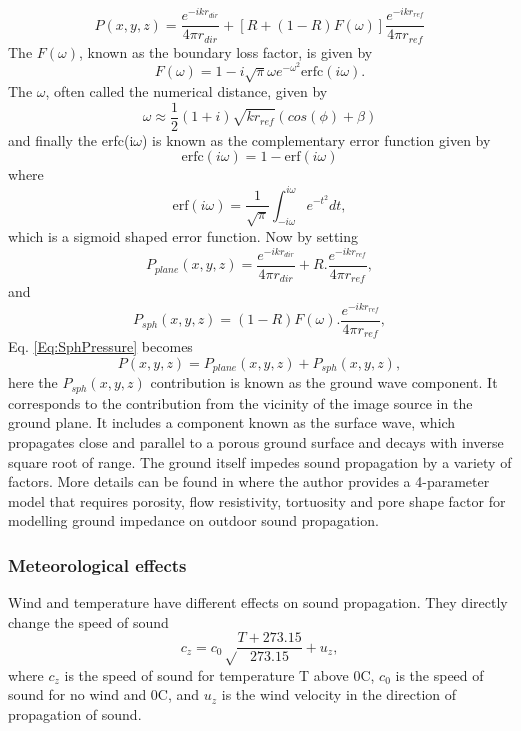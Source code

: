 \begin{equation}
    P(x,y,z)=\frac{e^{-ikr_{dir}}}{4\pi r_{dir}} + [R + (1-R)F(\omega)]\frac{e^{-ikr_{ref}}}{4\pi r_{ref}}
    \label{Eq:SphPressure}
\end{equation}
The $F(\omega)$, known as the boundary loss factor, is given by
\begin{equation}
    F(\omega)=1-i\sqrt{\pi}\omega e^{-\omega^2}\text{erfc}(i\omega).
\end{equation}
The $\omega$, often called the numerical distance, given by
\begin{equation}
    \omega \approx \frac{1}{2}(1+i)\sqrt{kr_{ref}}(cos(\phi)+\beta)
\end{equation}
and finally the erfc(i$\omega$) is known as the complementary error function given by 
\begin{equation}
    \text{erfc}(i\omega) = 1-\text{erf}(i\omega)
\end{equation}
where
\begin{equation}
    \text{erf}(i\omega)=\frac{1}{\sqrt\pi}\int_{-i\omega}^{i\omega}e^{-t^2}dt,
\end{equation}
which is a sigmoid shaped error function. Now by setting
\begin{equation}
    P_{plane}(x,y,z)=\frac{e^{-ikr_{dir}}}{4\pi r_{dir}} + R.\frac{e^{-ikr_{ref}}}{4\pi r_{ref}},
\end{equation}
and 
\begin{equation}
    P_{sph}(x,y,z)=(1-R)F(\omega).\frac{e^{-ikr_{ref}}}{4\pi r_{ref}},
\end{equation}
Eq. \ref{Eq:SphPressure} becomes
\begin{equation}
    P(x,y,z)=P_{plane}(x,y,z) + P_{sph}(x,y,z),
\end{equation}
here the $P_{sph}(x,y,z)$ contribution is known as the ground wave component. It corresponds to the contribution from the vicinity of the image source in the ground plane. It includes a component known as the surface wave, which propagates close and parallel to a porous ground surface and decays with inverse square root of range.
The ground itself impedes sound propagation by a variety of factors. More details can be found in \cite{attenborough2011outdoor} where the author provides a 4-parameter model that requires porosity, flow resistivity, tortuosity and pore shape factor for modelling ground impedance on outdoor sound propagation. 

\subsubsection{Meteorological effects}
Wind and temperature have different effects on sound propagation. They directly change the speed of sound
\begin{equation}
    c_z = c_0\sqrt\frac{T+273.15}{273.15} + u_z,
\end{equation}
where $c_z$ is the speed of sound for temperature T above 0\degree C, $c_0$ is the speed of sound for no wind and 0\degree C, and $u_z$ is the wind velocity in the direction of propagation of sound. 

